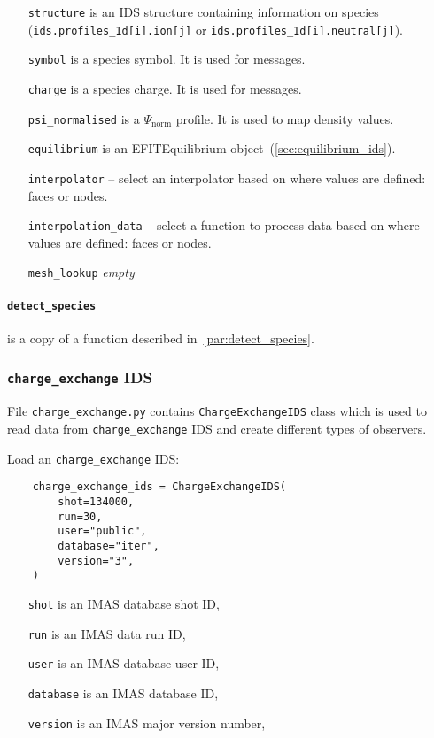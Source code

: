 \documentclass[../main.tex]{subfiles}
\begin{document}
\begin{itemize}[align=left]
    \item[\texttt{structure}] is an IDS structure containing information on species (\texttt{ids.profiles\_1d[i].ion[j]} or \texttt{ids.profiles\_1d[i].neutral[j]}).
    \item[\texttt{symbol}] is a species symbol. It is used for messages.
    \item[\texttt{charge}] is a species charge. It is used for messages.
    \item[\texttt{psi\_normalised}] is a $\Psi_\text{norm}$ profile. It is used to map density values.
    \item[\texttt{equilibrium}] is an EFITEquilibrium object~(\cref{sec:equilibrium_ids}).
    \item[\texttt{interpolator}] -- select an interpolator based on where values are defined: faces or nodes.
    \item[\texttt{interpolation\_data}] -- select a function to process data based on where values are defined: faces or nodes.
    \item[\texttt{mesh\_lookup}] \emph{empty}
\end{itemize}

\paragraph{\texttt{detect\_species}} is a copy of a function described in~\cref{par:detect_species}.

\subsubsection{\texttt{charge\_exchange} IDS}%
\label{sec:charge_exchange_ids}

File \texttt{charge\_exchange.py} contains \texttt{ChargeExchangeIDS} class which is used to read data from \texttt{charge\_exchange} IDS and create different types of observers.

Load an \texttt{charge\_exchange} IDS:
\begin{verbatim}
    charge_exchange_ids = ChargeExchangeIDS(
        shot=134000,
        run=30,
        user="public",
        database="iter",
        version="3",
    )
\end{verbatim}

\begin{itemize}[align=left]
    \item[\texttt{shot}] is an IMAS database shot ID,
    \item[\texttt{run}] is an IMAS data run ID,
    \item[\texttt{user}] is an IMAS database user ID,
    \item[\texttt{database}] is an IMAS database ID,
    \item[\texttt{version}] is an IMAS major version number,
\end{itemize}
\end{document}
